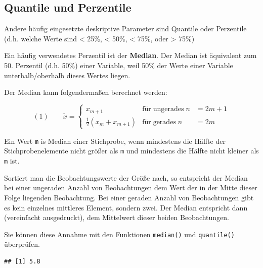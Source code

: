 \documentclass[
  ngerman,
]{book}
\newenvironment{Shaded}{\begin{snugshade}}{\end{snugshade}}
\newcommand{\CommentTok}[1]{\textcolor[rgb]{0.56,0.35,0.01}{\textit{#1}}}
\newcommand{\FloatTok}[1]{\textcolor[rgb]{0.00,0.00,0.81}{#1}}
\newcommand{\FunctionTok}[1]{\textcolor[rgb]{0.13,0.29,0.53}{\textbf{#1}}}
\newcommand{\NormalTok}[1]{#1}
\newcommand{\SpecialCharTok}[1]{\textcolor[rgb]{0.81,0.36,0.00}{\textbf{#1}}}
\begin{document}
\subsection{Quantile und Perzentile}\label{quantile-und-perzentile}

Andere häufig eingesetzte deskriptive Parameter sind Quantile oder Perzentile (d.h. welche Werte sind \textless{} 25\%, \textless{} 50\%, \textless{} 75\%, oder \textgreater{} 75\%)

Ein häufig verwendetes Perzentil ist der \textbf{Median}. Der Median ist äquivalent zum 50. Perzentil (d.h. 50\%) einer Variable, weil 50\% der Werte einer Variable unterhalb/oberhalb dieses Wertes liegen.

Der Median kann folgendermaßen berechnet werden:

\[
(1)\qquad
\tilde{x}=\left\{\begin{array}{lll}
x_{m+1} & \mathrm{für}\; \mathrm{ungerades} \; n &= 2m+1 \\
\frac{1}{2}\left(x_{m}+x_{m+1}\right) & \mathrm{für} \; \mathrm{gerades} \; n &= 2m
\end{array}\right.
\]

Ein Wert \texttt{m} is Median einer Stichprobe, wenn mindestens die Hälfte der Stichprobenelemente nicht
größer als \texttt{m} und mindestens die Hälfte nicht kleiner als \texttt{m} ist.

Sortiert man die Beobachtungswerte der Größe nach, so entspricht der Median bei einer ungeraden Anzahl von Beobachtungen dem Wert der in der Mitte dieser Folge liegenden Beobachtung. Bei einer geraden Anzahl von Beobachtungen gibt es kein einzelnes mittleres Element, sondern zwei. Der Median entspricht dann (vereinfacht ausgedruckt), dem Mittelwert dieser beiden Beobachtungen.

Sie können diese Annahme mit den Funktionen \texttt{median()} und \texttt{quantile()} überprüfen.

\begin{Shaded}
\end{Shaded}

\begin{verbatim}
## [1] 5.8
\end{verbatim}

\begin{Shaded}
\end{Shaded}
\end{document}
